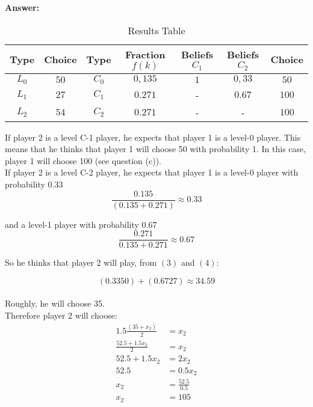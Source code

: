 \documentclass{report}
\begin{document}
\begin{itemize}
\textbf{Answer:}\\
\begin{table}
\begin{tabular}{|c|c|c|c|c|c|c|}
\hline
\textbf{Type} & \textbf{Choice} & \textbf{Type} & \textbf{Fraction $f(k)$} & \textbf{Beliefs $C_1$} & \textbf{Beliefs $C_2$} & \textbf{Choice} \\ \hline
$L_0$         & $50$            & $C_0$         & $0,135$                  & $1$                    & $0,33$                 & $50$            \\ \hline
$L_1$         & $27$           & $C_1$         & $0.271$                  & -                      & $0.67$                 & $100$            \\ \hline
$L_2$         & $54$            & $C_2$         & $0.271$                  & -                      & -                      & $100$            \\ \hline

\end{tabular}
\caption{Results Table}


\end{table}

If player 2 is a level C-1 player, he expects that player 1 is a level-0 player. This means that he thinks that player 1 will choose 50 with probability 1. In this case, player 1 will choose 100 (see question (c)).\\


If player 2 is a level C-2 player, he expects that player 1 is a level-0 player with probability 0.33
\begin{equation}
 \frac{0.135}{(0.135 + 0.271)}\approx0.33
\end{equation}

and a level-1 player with probability 0.67\\
\begin{equation}
 \frac{0.271}{0.135+0.271}\approx 0.67
\end{equation}

So he thinks that player 2 will play, from $(3) $ and $(4)$:

$$(0.33 50) + (0.67  27) \approx 34.59$$\\
Roughly, he will choose 35.\\

Therefore player 2 will choose:\\
\begin{align*}
1.5 \frac{(35 + x_2)}{2} &= x_2\\
 \frac{52.5 + 1.5x_2}{2}&= x_2\\
 52.5 + 1.5x_2 &= 2x_2\\
52.5 &= 0.5x_2\\
x_2 &= \frac{52.5}{0.5}\\
x_2&= 105\\
\end{align*}



\end{itemize}
\end{document}
